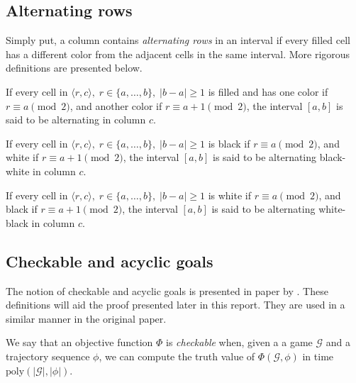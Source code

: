 \subsection{Alternating rows}
Simply put, a column contains \textit{alternating rows} in an interval if every filled cell has a different color from the adjacent cells in the same interval. More rigorous definitions are presented below.

\begin{defn}
If every cell in $\langle r, c \rangle, \; r \in \{a, \ldots, b\}, \; |b-a| \geq 1$ is filled and has one color if $r \equiv a \pmod{2}$, and another color if $r \equiv a + 1 \pmod{2}$, the interval $\left[ a, b \right]$ is said to be alternating in column $c$.
\end{defn}

\bigbreak

\begin{defn}
If every cell in $\langle r, c \rangle, \; r \in \{a, \ldots, b\}, \; |b-a| \geq 1$ is black if $r \equiv a \pmod{2}$, and white if $r \equiv a + 1 \pmod{2}$, the interval $\left[ a, b \right]$ is said to be alternating black-white in column $c$.
\end{defn}

\bigbreak

\begin{defn}
If every cell in $\langle r, c \rangle, \; r \in \{a, \ldots, b\}, \; |b-a| \geq 1$ is white if $r \equiv a \pmod{2}$, and black if $r \equiv a + 1 \pmod{2}$, the interval $\left[ a, b \right]$ is said to be alternating white-black in column $c$.
\end{defn}

\subsection{Checkable and acyclic goals}
The notion of checkable and acyclic goals is presented in paper by \citeauthor{tetris}. These definitions will aid the proof presented later in this report. They are used in a similar manner in the original paper.\\

\begin{defn}
\label{defn:checkable}
We say that an objective function $\Phi$ is \textit{checkable} when, given a a game $\mathcal{G}$ and a trajectory sequence $\phi$, we can compute the truth value of $\Phi(\mathcal{G}, \phi)$ in time $\text{poly}(|\mathcal{G}|, |\phi|)$.
\end{defn}


